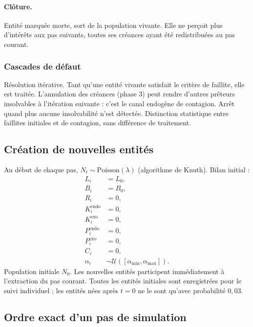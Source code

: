 \documentclass[10pt,a4paper]{article}
\begin{document}
\paragraph{Clôture.} Entité marquée morte, sort de la population vivante. Elle ne perçoit plus d'intérêts aux pas suivants, toutes ses créances ayant été redistribuées au pas courant.

\subsubsection{Cascades de défaut}

Résolution itérative. Tant qu'une entité vivante satisfait le critère de faillite, elle est traitée. L'annulation des créances (phase 3) peut rendre d'autres prêteurs insolvables à l'itération suivante : c'est le canal endogène de contagion. Arrêt quand plus aucune insolvabilité n'est détectée. Distinction statistique entre faillites initiales et de contagion, sans différence de traitement.

\subsection{Création de nouvelles entités}

Au début de chaque pas, \(N_t\sim\mathrm{Poisson}(\lambda)\) (algorithme de Knuth). Bilan initial :
\begin{align*}
L_i &= L_0,\\
B_i &= B_0,\\
R_i &= 0,\\
K_i^{\mathrm{endo}} &= 0,\\
K_i^{\mathrm{exo}} &= 0,\\
P_i^{\mathrm{endo}} &= 0,\\
P_i^{\mathrm{exo}} &= 0,\\
C_i &= 0,\\
\alpha_i &\sim\mathcal U([\alpha_{\min},\alpha_{\max}]).
\end{align*}
Population initiale \(N_0\). Les nouvelles entités participent immédiatement à l'extraction du pas courant. Toutes les entités initiales sont enregistrées pour le suivi individuel ; les entités nées après \(t=0\) ne le sont qu'avec probabilité \(0{,}03\).

\subsection{Ordre exact d'un pas de simulation}
\end{document}
